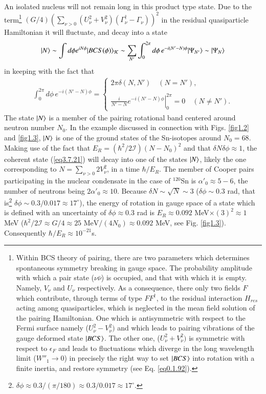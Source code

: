 An isolated nucleus will not remain long in this product type state. Due to the term\footnote{Within BCS theory of pairing, there are two parameters which determines spontaneous symmetry breaking in gauge space. The probability amplitude with which a pair state ($\nu\bar{\nu}$) is occupied, and that with which it is empty. Namely, $V_\nu$ and $U_\nu$ respectively. As a consequence, there only two fields $F$ which contribute, through terms of type $FF^\dagger$, to the residual interaction $H_{res}$ acting among quasiparticles, which is neglected in the mean field solution of the pairing Hamiltonian. One which is antisymmetric with respect to the Fermi surface namely ($U^2_\nu-V^2_\nu)$ and which leads to pairing vibrations of the gauge deformed state $|{BCS} \rangle$. The other one, ($U^2_\nu+V^2_\nu)$ is symmetric with respect to $\epsilon_F$ and leads to fluctuations which diverge in the long wavelength limit ($W''_1\to0$) in precisely the right way to set $|{BCS} \rangle$ into rotation with a finite inertia, and restore symmetry (see Eq. \ref{eq0.1.92}).}  $(G/4)\left(\sum_{\nu>0}\left(U^2_\nu+V^2_\nu\right)\left(\Gamma_\nu^\dagger-\Gamma_\nu\right)\right)^2$ in the residual quasiparticle Hamiltonian it will fluctuate, and decay into a state
\begin{align}\label{eqbeta}
|N\rangle \sim \int d\phi e^{iN\phi}|BCS(\phi)\rangle_{\mathcal{K}}\sim \sum_{N'}\int_0^{2\pi}d\phi\, e^{-i(N'-N)\phi}|{\Psi_{N'}} \rangle\sim|{\Psi_{N}} \rangle
\end{align}
in keeping with the fact that
\begin{align}\label{eq3.7.27}
\int_0^{2\pi}d\phi\, e^{-i(N'-N)\phi}=\left\{
\begin{array}{c}
 2\pi\delta(N,N')\quad (N=N'),\\ 
 \\
\left.\frac{i}{N'-N}e^{-i(N'-N)\phi}\right|^{2\pi}_0=0\quad (N\neq N').
\end{array} \right.
\end{align}
The state $|{N} \rangle$ is a member of the pairing rotational band centered around neutron number $N_0$. In the example discussed in connection with Figs. \ref{fig1.2} and \ref{fig1.3}, $|{N} \rangle$ is one of the ground states of the Sn-isotopes around $N_0=68$. Making use of the fact that $E_R=\left(\hbar^2/2\mathcal I\right)(N-N_0)^2$ and that $\delta N\delta\phi\approx1$, the coherent state (\ref{eq3.7.21}) will decay into one of the states $|{N} \rangle$, likely the one corresponding to $N=\sum_{\nu>0}2V_\nu^2$, in a time $\hbar/E_R$. The member of  Cooper pairs participating in the nuclear condensate in the case of $^{120}$Sn is $\alpha'_0\approx5-6$, the number of neutrons being $2\alpha'_0\approx10$. Because $\delta N\sim\sqrt{N}\sim3$ ($\delta\phi\sim0.3$ rad, that is\footnote{$\delta\phi\approx0.3/(\pi/180)\approx0.3/0.017\approx17^\circ$.} $\delta\phi\sim0.3/0.017\approx 17^\circ$), the energy of rotation in gauge space of a state which is defined with an uncertainty of $\delta\phi\approx0.3$ rad is  $E_R\approx0.092$ MeV$\times(3)^2\approx 1$ MeV ($\hbar^2/2\mathcal I\approx G/4\approx 25\text{ MeV}/(4N_0)\approx0.092$ MeV, see Fig. \ref{fig1.3}). Consequently $\hbar/E_R\approx10^{-21}$s. 


